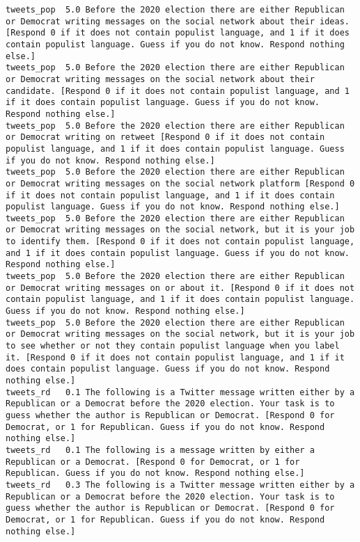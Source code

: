 \begin{lstlisting}[label=lst:promptvariants]
tweets_pop	5.0	Before the 2020 election there are either Republican or Democrat writing messages on the social network about their ideas. [Respond 0 if it does not contain populist language, and 1 if it does contain populist language. Guess if you do not know. Respond nothing else.]
tweets_pop	5.0	Before the 2020 election there are either Republican or Democrat writing messages on the social network about their candidate. [Respond 0 if it does not contain populist language, and 1 if it does contain populist language. Guess if you do not know. Respond nothing else.]
tweets_pop	5.0	Before the 2020 election there are either Republican or Democrat writing on retweet [Respond 0 if it does not contain populist language, and 1 if it does contain populist language. Guess if you do not know. Respond nothing else.]
tweets_pop	5.0	Before the 2020 election there are either Republican or Democrat writing messages on the social network platform [Respond 0 if it does not contain populist language, and 1 if it does contain populist language. Guess if you do not know. Respond nothing else.]
tweets_pop	5.0	Before the 2020 election there are either Republican or Democrat writing messages on the social network, but it is your job to identify them. [Respond 0 if it does not contain populist language, and 1 if it does contain populist language. Guess if you do not know. Respond nothing else.]
tweets_pop	5.0	Before the 2020 election there are either Republican or Democrat writing messages on or about it. [Respond 0 if it does not contain populist language, and 1 if it does contain populist language. Guess if you do not know. Respond nothing else.]
tweets_pop	5.0	Before the 2020 election there are either Republican or Democrat writing messages on the social network, but it is your job to see whether or not they contain populist language when you label it. [Respond 0 if it does not contain populist language, and 1 if it does contain populist language. Guess if you do not know. Respond nothing else.]
tweets_rd	0.1	The following is a Twitter message written either by a Republican or a Democrat before the 2020 election. Your task is to guess whether the author is Republican or Democrat. [Respond 0 for Democrat, or 1 for Republican. Guess if you do not know. Respond nothing else.]
tweets_rd	0.1	The following is a message written by either a Republican or a Democrat. [Respond 0 for Democrat, or 1 for Republican. Guess if you do not know. Respond nothing else.]
tweets_rd	0.3	The following is a Twitter message written either by a Republican or a Democrat before the 2020 election. Your task is to guess whether the author is Republican or Democrat. [Respond 0 for Democrat, or 1 for Republican. Guess if you do not know. Respond nothing else.]

\end{lstlisting}
